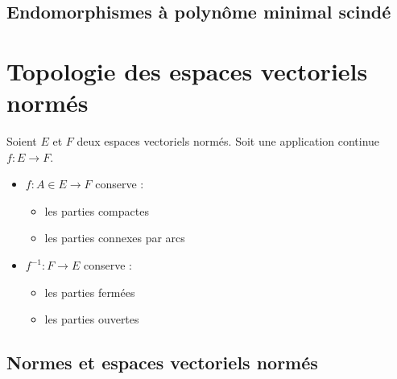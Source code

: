 \documentclass[11pt,a4paper,fleqn,pdftex]{report}
\begin{document}
\section{Endomorphismes à polynôme minimal scindé} %
\label{sec:endomorphismes_polynome_minimal_scinde}

\chapter{Topologie des espaces vectoriels normés}
\begin{methode}
     Soient $E$ et $F$ deux espaces vectoriels normés. Soit une application continue $f : E \to F$.
     \begin{itemize}
         \item $f : A\in E\to F$ conserve : 
         \begin{itemize}
            \item les parties compactes
            \item les parties connexes par arcs
         \end{itemize}
         \item $f^{-1} : F \to E$ conserve :
         \begin{itemize}
             \item les parties fermées
             \item les parties ouvertes
         \end{itemize}
     \end{itemize}
\end{methode}
\section{Normes et espaces vectoriels normés}
\end{document}
